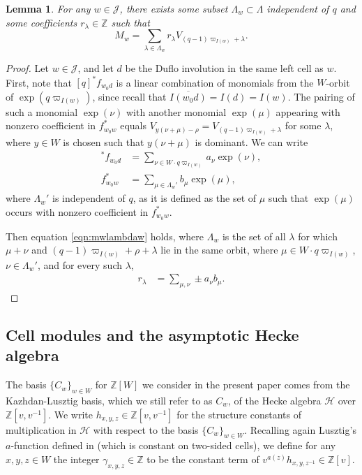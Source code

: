 \documentclass{amsart}
\newtheorem{lemma}[thm]{Lemma}
\theoremstyle{definition}
\begin{document}
\begin{lemma}\label{lem:mwweyl}
    For any $w \in \mathcal{J}$, there exists some subset $\Lambda_w \subset \Lambda$ independent of $q$ and some coefficients $r_\lambda \in \mathbb{Z}$ such that
    \begin{equation}\label{eqn:mwlambdaw}
        M_w = \sum_{\lambda \in \Lambda_w} r_\lambda V_{(q-1)\varpi_{I(w)} + \lambda}.
    \end{equation}
\end{lemma}
\begin{proof}
    Let $w \in \mathcal{J}$, and let $d$ be the Duflo involution in the same left cell as $w$. First, note that $[q]^*f_{w_0d}$ is a linear combination of monomials from the $W$-orbit of $\exp(q\varpi_{I(w)})$, since recall that $\overline{I(w_0d)} = I(d) = I(w)$. The pairing of such a monomial $\exp(\nu)$ with another monomial $\exp(\mu)$ appearing with nonzero coefficient in $f_{w_0w}^*$ equals $V_{y(\nu + \mu) - \rho} = V_{(q-1)\varpi_{I(w)} + \lambda}$ for some $\lambda$, where $y \in W$ is chosen such that $y(\nu + \mu)$ is dominant. We can write
    \begin{align*}
        [q]^*f_{w_0d} & = \sum_{\nu \in W \cdot q\varpi_{I(w)}} a_\nu \exp(\nu),\\
        f_{w_0w}^* & = \sum_{\mu \in \Lambda_w'} b_\mu \exp(\mu),
    \end{align*}
    where $\Lambda_w'$ is independent of $q$, as it is defined as the set of $\mu$ such that $\exp(\mu)$ occurs with nonzero coefficient in $f_{w_0w}^*$.
    
    Then equation \eqref{eqn:mwlambdaw} holds, where $\Lambda_w$ is the set of all $\lambda$ for which $\mu + \nu$ and $(q-1)\varpi_{I(w)} + \rho + \lambda$ lie in the same orbit, where $\mu \in W\cdot q\varpi_{I(w)}$, $\nu \in \Lambda_w'$, and for every such $\lambda$,
    \begin{align}
        r_\lambda & = \sum_{\mu, \nu} \pm a_\nu b_\mu.
    \end{align}
\end{proof}

\subsection{Cell modules and the asymptotic Hecke algebra}\label{sec:asymptotic}

The basis $\{C_w\}_{w \in W}$ for $\mathbb{Z}[W]$ we consider in the present paper comes from the Kazhdan-Lusztig basis, which we still refer to as $C_w$, of the Hecke algebra $\mathcal{H}$ over $\mathbb{Z}[v, v^{-1}]$. We write $h_{x,y,z} \in \mathbb{Z}[v, v^{-1}]$ for the structure constants of multiplication in $\mathcal{H}$ with respect to the basis $\{C_w\}_{w \in W}$. Recalling again Lusztig's $a$-function defined in \cite{LCellsI} (which is constant on two-sided cells), we define for any $x, y, z \in W$ the integer $\gamma_{x,y,z} \in \mathbb{Z}$ to be the constant term of $v^{a(z)}h_{x,y,z^{-1}} \in \mathbb{Z}[v]$.
\end{document}
